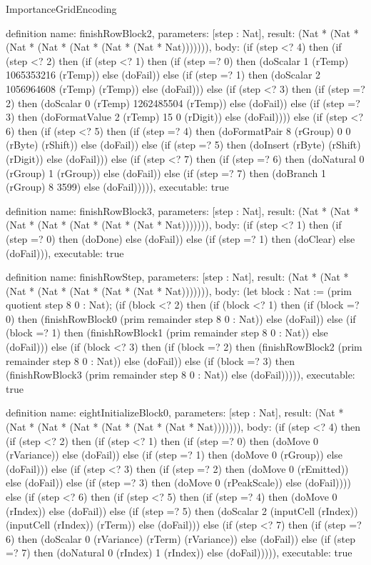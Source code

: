 \begin{lexlean}{ImportanceGridEncoding}
\begin{semanticmodule}
definition{
  name: finishRowBlock2,
  parameters: [step : Nat],
  result: (Nat * (Nat * (Nat * (Nat * (Nat * (Nat * (Nat * Nat))))))),
  body: (if (step <? 4) then
      (if (step <? 2) then
      (if (step <? 1) then
      (if (step =? 0) then (doScalar 1 (rTemp) 1065353216 (rTemp)) else (doFail)) else
      (if (step =? 1) then (doScalar 2 1056964608 (rTemp) (rTemp)) else (doFail))) else
      (if (step <? 3) then
      (if (step =? 2) then (doScalar 0 (rTemp) 1262485504 (rTemp)) else (doFail)) else
      (if (step =? 3) then (doFormatValue 2 (rTemp) 15 0 (rDigit)) else (doFail)))) else
      (if (step <? 6) then
      (if (step <? 5) then
      (if (step =? 4) then (doFormatPair 8 (rGroup) 0 0 (rByte) (rShift)) else (doFail)) else
      (if (step =? 5) then (doInsert (rByte) (rShift) (rDigit)) else (doFail))) else
      (if (step <? 7) then
      (if (step =? 6) then (doNatural 0 (rGroup) 1 (rGroup)) else (doFail)) else
      (if (step =? 7) then (doBranch 1 (rGroup) 8 3599) else (doFail))))),
  executable: true
}

definition{
  name: finishRowBlock3,
  parameters: [step : Nat],
  result: (Nat * (Nat * (Nat * (Nat * (Nat * (Nat * (Nat * Nat))))))),
  body: (if (step <? 1) then
      (if (step =? 0) then (doDone) else (doFail)) else
      (if (step =? 1) then (doClear) else (doFail))),
  executable: true
}

definition{
  name: finishRowStep,
  parameters: [step : Nat],
  result: (Nat * (Nat * (Nat * (Nat * (Nat * (Nat * (Nat * Nat))))))),
  body: (let block : Nat := (prim quotient step 8 0 : Nat); (if (block <? 2) then
      (if (block <? 1) then
      (if (block =? 0) then (finishRowBlock0 (prim remainder step 8 0 : Nat)) else (doFail)) else
      (if (block =? 1) then (finishRowBlock1 (prim remainder step 8 0 : Nat)) else (doFail))) else
      (if (block <? 3) then
      (if (block =? 2) then (finishRowBlock2 (prim remainder step 8 0 : Nat)) else (doFail)) else
      (if (block =? 3) then (finishRowBlock3 (prim remainder step 8 0 : Nat)) else (doFail))))),
  executable: true
}

definition{
  name: eightInitializeBlock0,
  parameters: [step : Nat],
  result: (Nat * (Nat * (Nat * (Nat * (Nat * (Nat * (Nat * Nat))))))),
  body: (if (step <? 4) then
      (if (step <? 2) then
      (if (step <? 1) then
      (if (step =? 0) then (doMove 0 (rVariance)) else (doFail)) else
      (if (step =? 1) then (doMove 0 (rGroup)) else (doFail))) else
      (if (step <? 3) then
      (if (step =? 2) then (doMove 0 (rEmitted)) else (doFail)) else
      (if (step =? 3) then (doMove 0 (rPeakScale)) else (doFail)))) else
      (if (step <? 6) then
      (if (step <? 5) then
      (if (step =? 4) then (doMove 0 (rIndex)) else (doFail)) else
      (if (step =? 5) then (doScalar 2 (inputCell (rIndex)) (inputCell (rIndex)) (rTerm)) else (doFail))) else
      (if (step <? 7) then
      (if (step =? 6) then (doScalar 0 (rVariance) (rTerm) (rVariance)) else (doFail)) else
      (if (step =? 7) then (doNatural 0 (rIndex) 1 (rIndex)) else (doFail))))),
  executable: true
}


\end{semanticmodule}
\end{lexlean}
